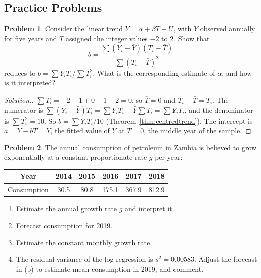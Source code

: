 \documentclass[11pt,a4paper]{article}
\numberwithin{equation}{section}
\theoremstyle{definition}
\newtheorem{problemx}{Problem}[subsection]
\newenvironment{problem}{\begin{problemx}}{\end{problemx}}
\newenvironment{solution}
  {\renewcommand{\qedsymbol}{}\begin{proof}[\textit{Solution}.]}
  {\end{proof}}
\begin{document}
\subsection{Practice Problems}

\begin{problem}
Consider the linear trend $Y = \alpha + \beta T + U$, with $Y$ observed annually for five years and $T$ assigned the integer values $-2$ to $2$. Show
that
\[
b = \frac{\sum (Y_i - \bar Y)(T_i - \bar T)}{\sum (T_i - \bar T)^2}
\]
reduces to $b = \sum Y_iT_i/\sum T_i^2$. What is the corresponding estimate of $\alpha$, and how is it interpreted?
\end{problem}

\begin{solution}
$\sum T_i = -2 - 1 + 0 + 1 + 2 = 0$, so $\bar T = 0$ and $T_i - \bar T = T_i$. The numerator is
$\sum (Y_i - \bar Y)T_i = \sum Y_iT_i - \bar Y\sum T_i = \sum Y_iT_i$, and the denominator is $\sum T_i^2 = 10$. So $b = \sum Y_iT_i/10$
(Theorem~\ref{thm:centredtrend}). The intercept is $a = \bar Y - b\bar T = \bar Y$, the fitted value of $Y$ at $T = 0$, the middle year of the
sample.
\end{solution}

\begin{problem}
The annual consumption of petroleum in Zambia is believed to grow exponentially at a constant proportionate rate $g$ per year:
\begin{center}
\begin{tabular}{c|ccccc}
Year & 2014 & 2015 & 2016 & 2017 & 2018\\\hline
Consumption & 30.5 & 80.8 & 175.1 & 367.9 & 812.9
\end{tabular}
\end{center}
\begin{enumerate}[label=(\alph*)]
\item Estimate the annual growth rate $g$ and interpret it.
\item Forecast consumption for 2019.
\item Estimate the constant monthly growth rate.
\item The residual variance of the log regression is $s^2 = 0.00583$. Adjust the forecast in (b) to estimate mean consumption in 2019, and comment.
\end{enumerate}
\end{problem}
\end{document}

